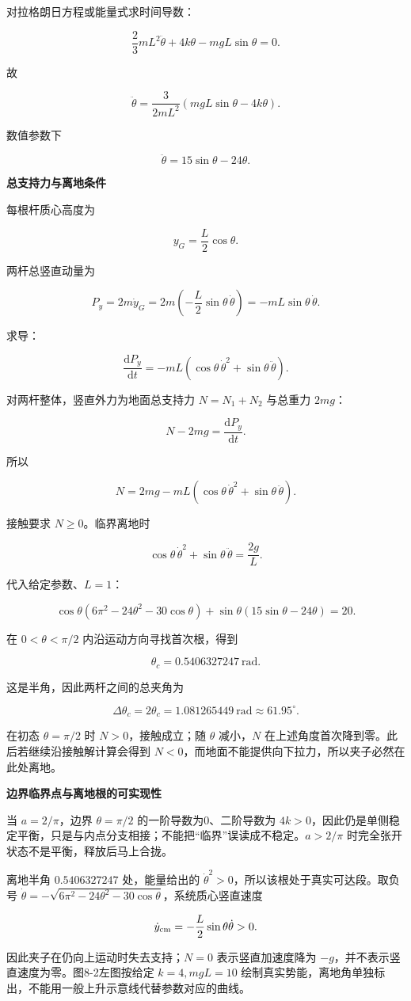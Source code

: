 \documentclass[12pt,a4paper,UTF8]{ctexart}
\begin{document}
对拉格朗日方程或能量式求时间导数：

\[\frac23mL^2\ddot\theta+4k\theta-mgL\sin\theta=0.\]

故

\[\boxed{
\ddot\theta=\frac{3}{2mL^2}(mgL\sin\theta-4k\theta)
}.\]

数值参数下

\[\boxed{\ddot\theta=15\sin\theta-24\theta}.\]

\textbf{总支持力与离地条件}

每根杆质心高度为

\[y_G=\frac L2\cos\theta.\]

两杆总竖直动量为

\[P_y=2m\dot y_G
=2m\left(-\frac L2\sin\theta\,\dot\theta\right)
=-mL\sin\theta\,\dot\theta.\]

求导：

\[\frac{\mathrm{d}P_y}{\mathrm{d}t}
=-mL\left(\cos\theta\,\dot\theta^2+\sin\theta\,\ddot\theta\right).\]

对两杆整体，竖直外力为地面总支持力 \(N=N_1+N_2\) 与总重力 \(2mg\)：

\[N-2mg=\frac{\mathrm{d}P_y}{\mathrm{d}t}.\]

所以

\[\boxed{
N=2mg-mL\left(
\cos\theta\,\dot\theta^2+\sin\theta\,\ddot\theta
\right)
}.\]

接触要求 \(N\ge0\)。临界离地时

\[\boxed{
\cos\theta\,\dot\theta^2+\sin\theta\,\ddot\theta
=\frac{2g}{L}
}.\]

代入给定参数、\(L=1\)：

\[\cos\theta(6\pi^2-24\theta^2-30\cos\theta)
+\sin\theta(15\sin\theta-24\theta)=20.\]

在 \(0<\theta<\pi/2\) 内沿运动方向寻找首次根，得到

\[\boxed{\theta_c=0.5406327247\ \mathrm{rad}}.\]

这是半角，因此两杆之间的总夹角为

\[\boxed{
\Delta\theta_c=2\theta_c
=1.081265449\ \mathrm{rad}
\approx61.95^\circ
}.\]

在初态 \(\theta=\pi/2\) 时 \(N>0\)，接触成立；随 \(\theta\) 减小，\(N\)
在上述角度首次降到零。此后若继续沿接触解计算会得到
\(N<0\)，而地面不能提供向下拉力，所以夹子必然在此处离地。

\textbf{边界临界点与离地根的可实现性}

当 \(a=2/\pi\)，边界 \(\theta=\pi/2\) 的一阶导数为0、二阶导数为
\(4k>0\)，因此仍是单侧稳定平衡，只是与内点分支相接；不能把``临界''误读成不稳定。\(a>2/\pi\)
时完全张开状态不是平衡，释放后马上合拢。

离地半角 \(0.5406327247\) 处，能量给出的
\(\dot\theta^2>0\)，所以该根处于真实可达段。取负号
\(\dot\theta=-\sqrt{6\pi^2-24\theta^2-30\cos\theta}\)，系统质心竖直速度

\[\dot y_{\rm cm}=-\frac L2\sin\theta\dot\theta>0.\]

因此夹子在仍向上运动时失去支持；\(N=0\) 表示竖直加速度降为
\(-g\)，并不表示竖直速度为零。图8-2左图按给定 \(k=4,mgL=10\)
绘制真实势能，离地角单独标出，不能用一般上升示意线代替参数对应的曲线。
\end{document}
